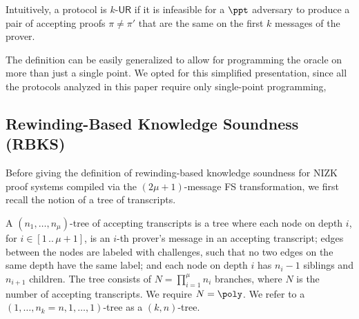 \documentclass[10pt]{llncs}
\newcommand{\pcvarstyle}[1]{\mathsf{#1}}
\newcommand{\range}[2] {[#1 \, .. \, #2]}
\newcommand{\srs}{\pcvarstyle{srs}}
\newcommand{\zkproof}{\pi}
\newcommand{\ur}[1]{{#1\text{-}\mathsf{UR}}}
\DeclareRobustCommand{\markulf}[2] {}%
\begin{document}
Intuitively, a protocol is $\ur{k}$ if it is infeasible for a $\ppt$ adversary to produce a pair of accepting proofs $\zkproof \neq \zkproof'$ that are the same on the first $k$ messages of the prover.  

The definition can be easily generalized to allow for programming the oracle on more than just a single point. We opted for this simplified presentation, since all the protocols analyzed in this paper require only single-point programming, 


\subsection{Rewinding-Based Knowledge Soundness (RBKS)}

Before giving the definition of rewinding-based knowledge soundness for NIZK proof systems compiled via the $(2\mu + 1)$-message FS transformation, we first recall the notion of a tree of transcripts.
\begin{definition}
	\label{def:tree_of_accepting_transcripts}
	A $(n_1,
	\ldots, n_\mu)$-tree of accepting transcripts is a tree where each node on
	depth $i$, for $i \in \range{1}{\mu + 1}$, is an $i$-th prover's message in an
	accepting transcript; edges between the nodes are labeled with
	challenges, such that no two edges on the same depth have the same
	label; and each node on depth $i$ has $n_{i} - 1$ siblings and $n_{i +
		1}$ children. The tree consists of $N = \prod_{i = 1}^\mu n_i$
	branches, where $N$ is the number of accepting transcripts. We require $N = \poly$. We refer to a $(1, \ldots, n_k=n, 1, \ldots, 1)$-tree as a $(k,n)$-tree.
\end{definition}

\iffalse
\end{document}
